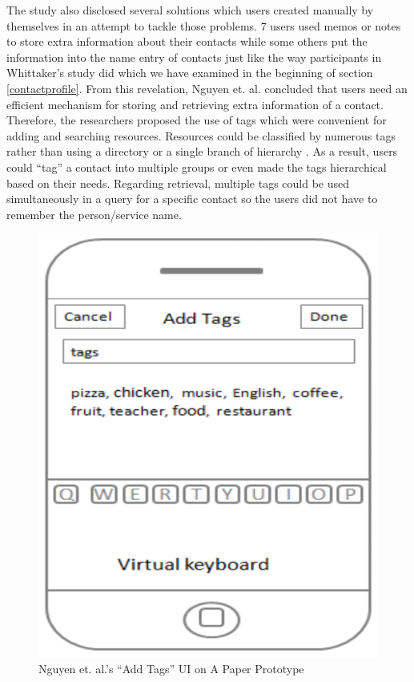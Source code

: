 The study also disclosed several solutions which users created manually by themselves in an attempt to tackle those problems. 7 users used memos or notes to store extra information about their contacts while some others put the information into the name entry of contacts just like the way participants in Whittaker's study did which we have examined in the beginning of section \ref{contactprofile}. From this revelation, Nguyen et. al. concluded that users need an efficient mechanism for storing and retrieving extra information of a contact. Therefore, the researchers proposed the use of tags which were convenient for adding and searching resources. Resources could be classified by numerous tags rather than using a directory or a single branch of hierarchy \cite{millen2005social}. As a result, users could ``tag'' a contact into multiple groups or even made the tags hierarchical based on their needs. Regarding retrieval, multiple tags could be used simultaneously in a query for a specific contact so the users did not have to remember the person/service name.

\begin{figure}[!h]
\begin{centering}
\includegraphics[scale=0.5]{pics/paper_prototype_1}
\caption{Nguyen et. al.'s ``Add Tags'' UI on A Paper Prototype}\label{fig:paper_prototype_1}
\end{centering}
\end{figure}

